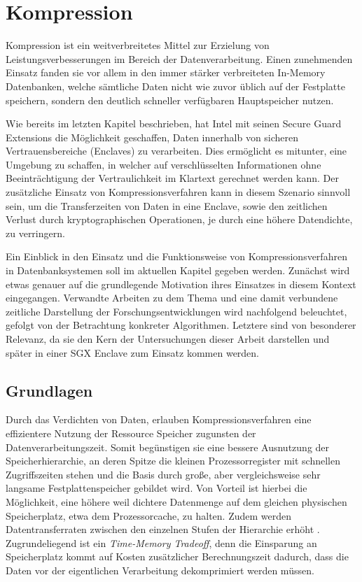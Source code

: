 
\chapter{Kompression}

Kompression ist ein weitverbreitetes Mittel zur Erzielung von Leistungsverbesserungen im Bereich der Datenverarbeitung. Einen zunehmenden Einsatz fanden sie vor allem in den immer stärker verbreiteten In-Memory Datenbanken, welche sämtliche Daten nicht wie zuvor üblich auf der Festplatte speichern, sondern den deutlich schneller verfügbaren Hauptspeicher nutzen.

Wie bereits im letzten Kapitel beschrieben, hat Intel mit seinen Secure Guard Extensions die Möglichkeit geschaffen, Daten innerhalb von sicheren Vertrauensbereiche (Enclaves) zu verarbeiten. Dies ermöglicht es mitunter, eine Umgebung zu schaffen, in welcher auf verschlüsselten Informationen ohne Beeinträchtigung der Vertraulichkeit im Klartext gerechnet werden kann. Der zusätzliche Einsatz von Kompressionsverfahren kann in diesem Szenario sinnvoll sein, um die Transferzeiten von Daten in eine Enclave, sowie den zeitlichen Verlust durch kryptographischen Operationen, je durch eine höhere Datendichte, zu verringern.

Ein Einblick in den Einsatz und die Funktionsweise von Kompressionsverfahren in Datenbanksystemen soll im aktuellen Kapitel gegeben werden. Zunächst wird etwas genauer auf die grundlegende Motivation ihres Einsatzes in diesem Kontext eingegangen. Verwandte Arbeiten zu dem Thema und eine damit verbundene zeitliche Darstellung der Forschungsentwicklungen wird nachfolgend beleuchtet, gefolgt von der Betrachtung konkreter Algorithmen. Letztere sind von besonderer Relevanz, da sie den Kern der Untersuchungen dieser Arbeit darstellen und später in einer SGX Enclave zum Einsatz kommen werden.

\section{Grundlagen} %

Durch das Verdichten von Daten, erlauben Kompressionsverfahren eine effizientere Nutzung der Ressource Speicher zugunsten der Datenverarbeitungszeit. Somit begünstigen sie eine bessere Ausnutzung der Speicherhierarchie, an deren Spitze die kleinen Prozessorregister mit schnellen Zugriffszeiten stehen und die Basis durch große, aber vergleichsweise sehr langsame Festplattenspeicher gebildet wird. Von Vorteil ist hierbei die Möglichkeit, eine höhere weil dichtere Datenmenge auf dem gleichen physischen Speicherplatz, etwa dem Prozessorcache, zu halten. Zudem werden Datentransferraten zwischen den einzelnen Stufen der Hierarchie erhöht \cite{Croft2009}. Zugrundeliegend ist ein \textit{Time-Memory Tradeoff}, denn die Einsparung an Speicherplatz kommt auf Kosten zusätzlicher Berechnungszeit dadurch, dass die Daten vor der eigentlichen Verarbeitung dekomprimiert werden müssen.

